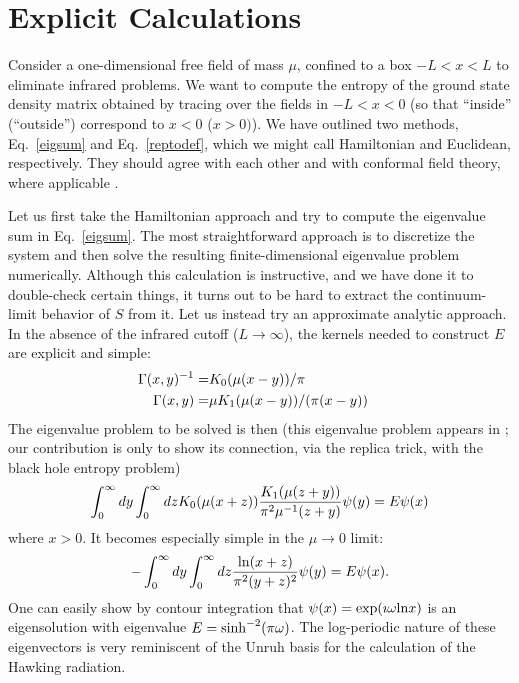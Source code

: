 \documentclass[12pt]{article}
\begin{document}
\section{Explicit Calculations}

Consider a one-dimensional free field of mass $\mu$,
confined to a box $-L<x<L$ to eliminate infrared problems.
We want to compute the entropy of the ground
state density matrix obtained by tracing over the fields in $-L<x<0$
(so that ``inside'' (``outside'') correspond to $x<0$ ($x>0)$).
We have outlined two methods, Eq.~\ref{eigsum} and Eq.~\ref{reptodef}, which
we might call Hamiltonian and Euclidean, respectively. They should agree with
each other and with conformal field theory, where applicable \cite{Holzhey}.

Let us first take the Hamiltonian approach and try to compute the eigenvalue
sum in Eq.~\ref{eigsum}. The most straightforward approach is to discretize
the system and then solve the resulting finite-dimensional eigenvalue problem
numerically. Although this calculation is instructive, and we have done it
to double-check certain things, it turns out to be hard to extract the
continuum-limit behavior of $S$ from it. Let us instead try an approximate
analytic approach. In the absence of the infrared cutoff ($L\to\infty$),
the kernels needed to construct $E$ are explicit and simple:
\begin{eqnarray}
\Gamma(x,y)^{-1} =&K_0(\mu(x-y))/\pi\cr
\Gamma(x,y) =&\mu K_1(\mu(x-y))/(\pi (x-y))
\end{eqnarray}
The eigenvalue problem to be solved is then (this eigenvalue problem appears
in \cite{Bombelli}; our contribution is only to show its connection, via the
replica trick, with the black hole entropy problem)
\begin{equation}
\int_0^\infty dy\int_0^\infty dz
	K_0(\mu(x+z)) {K_1(\mu(z+y))\over\pi^2\mu^{-1}(z+y)} \psi(y) = E\psi(x)
\end{equation}
where $x>0$. It becomes especially simple in the $\mu\to 0$ limit:
\begin{equation}
-\int_0^\infty dy\int_0^\infty dz{{\rm \ln}(x+z)\over \pi^2(y+z)^2}
                \psi(y) = E \psi(x).
\end{equation}
One can easily show by contour integration that
$\psi(x) = \exp(\imath\omega {\rm \ln} x)$ is an eigensolution with eigenvalue
$E ={\rm sinh}^{-2}(\pi\omega)$. The log-periodic nature of these
eigenvectors is very reminiscent of the Unruh basis for the calculation of
the Hawking radiation.
\end{document}
